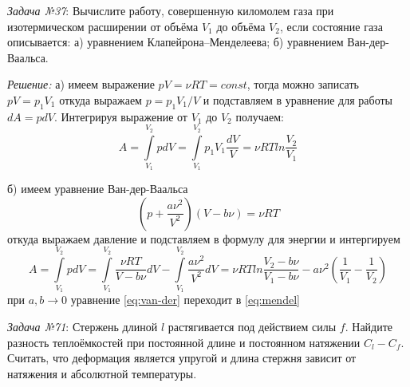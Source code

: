 \documentclass[14pt,final,titlepage,pscyr]{hedwork}
\begin{document}
\maketitle
\emph{Задача №37}: Вычислите работу, совершенную киломолем газа при 
изотермическом расширении от объёма \( V_1 \) до объёма \( V_2 \), если 
состояние газа описывается: а) уравнением Клапейрона--Менделеева; б) уравнением 
Ван-дер-Ваальса.

\emph{Решение:}
а) имеем выражение \( pV = \nu RT = const \), тогда можно записать 
\( pV = p_1 V_1 \) откуда выражаем \( p = p_1 V_1 / V \) и подставляем в 
уравнение для работы \( dA = pdV \). Интегрируя выражение от \( V_1 \) до 
\( V_2 \) получаем:
\begin{equation}
	A = \int\limits_{V_1}^{V_2} pdV = \int\limits_{V_1}^{V_2} p_1 V_1 
		\frac{dV}{V} = \nu RT ln\frac{V_2}{V_1}
	\label{eq:mendel}
\end{equation}

б) имеем уравнение Ван-дер-Ваальса
\[
	\left( p + \frac{a\nu^2}{V^2} \right)\left( V - b\nu \right) = \nu RT
\]
откуда выражаем давление и подставляем в формулу для энергии и интергируем
\begin{equation}
	A = \int\limits_{V_1}^{V_2} pdV = \int\limits_{V_1}^{V_2} 
		\frac{\nu RT}{V-b\nu} dV - \int\limits_{V_1}^{V_2} 
		\frac{a\nu^2}{V^2} dV = \nu RT ln\frac{V_2 - b\nu}{V_1 - b\nu} - 
		a\nu^2\left( \frac{1}{V_1} - \frac{1}{V_2}\right)
	\label{eq:van-der}
\end{equation}
при \( a,b \rightarrow 0 \) уравнение \eqref{eq:van-der} переходит в 
\eqref{eq:mendel}
\newpage

\emph{Задача №71}: Стержень длиной \( l \) растягивается под действием силы 
\( f \). Найдите разность теплоёмкостей при постоянной длине и постоянном 
натяжении \( C_l - C_f \). Считать, что деформация является упругой и длина 
стержня зависит от натяжения и абсолютной температуры.
\end{document}
